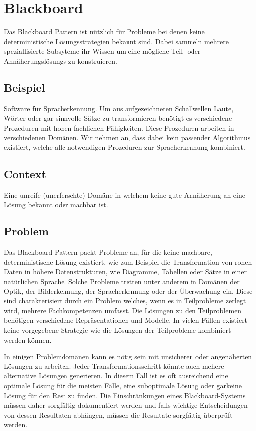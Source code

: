 \section{Blackboard}


Das Blackboard Pattern ist nützlich für Probleme bei denen keine deterministische Lösungsstrategien bekannt sind. Dabei sammeln mehrere speziallisierte Subsyteme ihr Wissen um eine mögliche Teil- oder Annäherungslösungs zu konstruieren.

\subsection*{Beispiel}


Software für Spracherkennung. Um aus aufgezeichneten Schallwellen Laute, Wörter oder gar sinnvolle Sätze zu transformieren benötigt es verschiedene Prozeduren mit hohen fachlichen Fähigkeiten. Diese Prozeduren arbeiten in verschiedenen Domänen. Wir nehmen an, dass dabei kein passender Algorithmus existiert, welche alle notwendigen Prozeduren zur Spracherkennung kombiniert.

\subsection*{Context}


Eine unreife (unerforschte) Domäne in welchem keine gute Annäherung an eine Lösung bekannt oder machbar ist.

\subsection*{Problem}


Das Blackboard Pattern packt Probleme an, für die keine machbare, deterministische Lösung existiert, wie zum Beispiel die Transformation von rohen Daten in höhere Datenstrukturen, wie Diagramme, Tabellen oder Sätze in einer natürlichen Sprache. Solche Probleme tretten unter anderem in Domänen der Optik, der Bilderkennung, der Spracherkennung oder der Überwachung ein. Diese sind charakterisiert durch ein Problem welches, wenn es in Teilprobleme zerlegt wird, mehrere Fachkompetenzen umfasst. Die Lösungen zu den Teilproblemen benötigen verschiedene Repräsentationen und Modelle. In vielen Fällen existiert keine vorgegebene Strategie wie die Lösungen der Teilprobleme kombiniert werden können.

In einigen Problemdomänen kann es nötig sein mit unsicheren oder angenäherten Lösungen zu arbeiten. Jeder Transformationsschritt könnte auch mehere alternative Lösungen generieren. In diesem Fall ist es oft ausreichend eine optimale Lösung für die meisten Fälle, eine suboptimale Lösung oder garkeine Lösung für den Rest zu finden. Die Einschränkungen eines Blackboard-Systems müssen daher sorgfältig dokumentiert werden und falls wichtige Entscheidungen von dessen Resultaten abhängen, müssen die Resultate sorgfältig überprüft werden.

